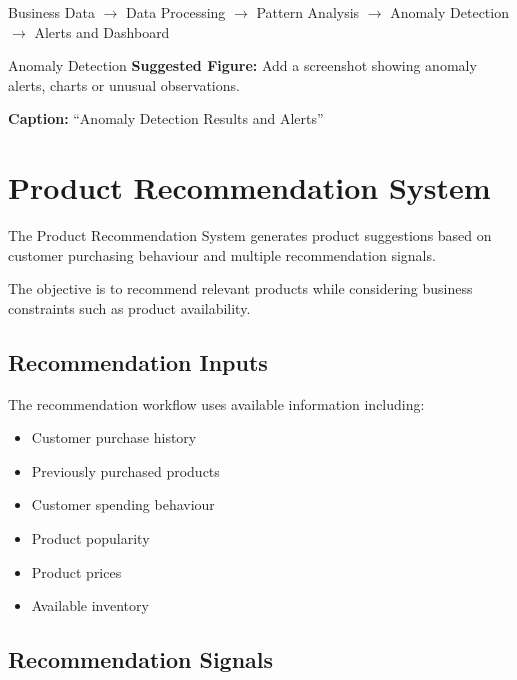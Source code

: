 \documentclass[12pt,a4paper]{report}
\begin{document}
\begin{center}
Business Data
$\rightarrow$
Data Processing
$\rightarrow$
Pattern Analysis
$\rightarrow$
Anomaly Detection
$\rightarrow$
Alerts and Dashboard
\end{center}

\begin{screenshotplaceholder}{Anomaly Detection}
\textbf{Suggested Figure:} Add a screenshot showing anomaly alerts,
charts or unusual observations.

\textbf{Caption:} ``Anomaly Detection Results and Alerts''
\end{screenshotplaceholder}



\section{Product Recommendation System}

The Product Recommendation System generates product suggestions based
on customer purchasing behaviour and multiple recommendation signals.

The objective is to recommend relevant products while considering
business constraints such as product availability.

\subsection{Recommendation Inputs}

The recommendation workflow uses available information including:

\begin{itemize}[leftmargin=1.2cm]
    \item Customer purchase history
    \item Previously purchased products
    \item Customer spending behaviour
    \item Product popularity
    \item Product prices
    \item Available inventory
\end{itemize}


\subsection{Recommendation Signals}
\end{document}
